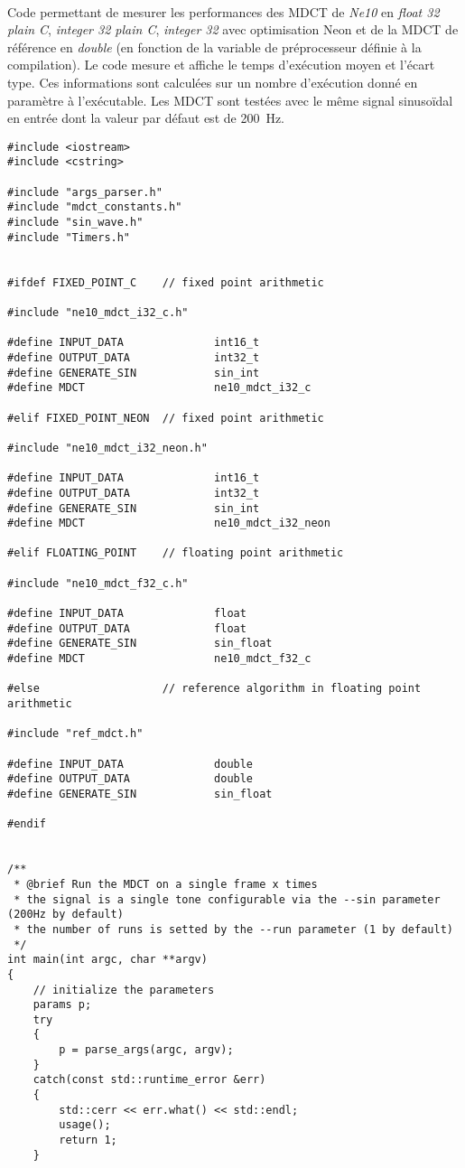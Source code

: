 \documentclass{article}
\begin{document}
\paragraph{}
Code permettant de mesurer les performances des MDCT de \emph{Ne10} en \emph{float 32 plain C}, \emph{integer 32 plain C}, \emph{integer 32} avec optimisation Neon et de la MDCT de référence en \emph{double} (en fonction de la variable de préprocesseur définie à la compilation). Le code mesure et affiche le temps d'exécution moyen et l'écart type. Ces informations sont calculées sur un nombre d'exécution donné en paramètre à l'exécutable. Les MDCT sont testées avec le même signal sinusoïdal en entrée dont la valeur par défaut est de \SI{200}{\hertz}.
\lstset{language=C++}
\begin{lstlisting}
#include <iostream>
#include <cstring>

#include "args_parser.h"
#include "mdct_constants.h"
#include "sin_wave.h"
#include "Timers.h"


#ifdef FIXED_POINT_C    // fixed point arithmetic

#include "ne10_mdct_i32_c.h"

#define INPUT_DATA              int16_t
#define OUTPUT_DATA             int32_t
#define GENERATE_SIN            sin_int
#define MDCT                    ne10_mdct_i32_c

#elif FIXED_POINT_NEON  // fixed point arithmetic

#include "ne10_mdct_i32_neon.h"

#define INPUT_DATA              int16_t
#define OUTPUT_DATA             int32_t
#define GENERATE_SIN            sin_int
#define MDCT                    ne10_mdct_i32_neon

#elif FLOATING_POINT    // floating point arithmetic

#include "ne10_mdct_f32_c.h"

#define INPUT_DATA              float
#define OUTPUT_DATA             float
#define GENERATE_SIN            sin_float
#define MDCT                    ne10_mdct_f32_c

#else                   // reference algorithm in floating point arithmetic

#include "ref_mdct.h"

#define INPUT_DATA              double
#define OUTPUT_DATA             double
#define GENERATE_SIN            sin_float

#endif


/**
 * @brief Run the MDCT on a single frame x times
 * the signal is a single tone configurable via the --sin parameter (200Hz by default)
 * the number of runs is setted by the --run parameter (1 by default)
 */
int main(int argc, char **argv)
{
    // initialize the parameters
    params p;
    try
    {
        p = parse_args(argc, argv);
    }
    catch(const std::runtime_error &err)
    {
        std::cerr << err.what() << std::endl;
        usage();
        return 1;
    }


\end{lstlisting}
\end{document}
